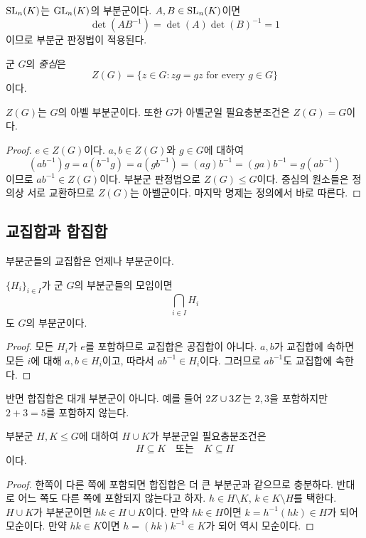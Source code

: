 \begin{example}
$\operatorname{SL}_n(K)$는 $\operatorname{GL}_n(K)$의 부분군이다. $A,B\in\operatorname{SL}_n(K)$이면
\[
  \det(AB^{-1})=\det(A)\det(B)^{-1}=1
\]
이므로 부분군 판정법이 적용된다.
\end{example}

\begin{definition}[중심]
군 $G$의 \emph{중심}은
\[
  Z(G)=\{z\in G:zg=gz\text{ for every }g\in G\}
\]
이다.
\end{definition}

\begin{proposition}
$Z(G)$는 $G$의 아벨 부분군이다. 또한 $G$가 아벨군일 필요충분조건은 $Z(G)=G$이다.
\end{proposition}

\begin{proof}
$e\in Z(G)$이다. $a,b\in Z(G)$와 $g\in G$에 대하여
\[
  (ab^{-1})g=a(b^{-1}g)=a(gb^{-1})=(ag)b^{-1}=(ga)b^{-1}=g(ab^{-1})
\]
이므로 $ab^{-1}\in Z(G)$이다. 부분군 판정법으로 $Z(G)\le G$이다. 중심의 원소들은 정의상 서로 교환하므로 $Z(G)$는 아벨군이다. 마지막 명제는 정의에서 바로 따른다.
\end{proof}

\subsection{교집합과 합집합}

부분군들의 교집합은 언제나 부분군이다.

\begin{proposition}
$\{H_i\}_{i\in I}$가 군 $G$의 부분군들의 모임이면
\[
  \bigcap_{i\in I}H_i
\]
도 $G$의 부분군이다.
\end{proposition}

\begin{proof}
모든 $H_i$가 $e$를 포함하므로 교집합은 공집합이 아니다. $a,b$가 교집합에 속하면 모든 $i$에 대해 $a,b\in H_i$이고, 따라서 $ab^{-1}\in H_i$이다. 그러므로 $ab^{-1}$도 교집합에 속한다.
\end{proof}

반면 합집합은 대개 부분군이 아니다. 예를 들어 $2Z\cup3Z$는 $2,3$을 포함하지만 $2+3=5$를 포함하지 않는다.

\begin{proposition}
부분군 $H,K\le G$에 대하여 $H\cup K$가 부분군일 필요충분조건은
\[
  H\subseteq K\quad\text{또는}\quad K\subseteq H
\]
이다.
\end{proposition}

\begin{proof}
한쪽이 다른 쪽에 포함되면 합집합은 더 큰 부분군과 같으므로 충분하다. 반대로 어느 쪽도 다른 쪽에 포함되지 않는다고 하자. $h\in H\setminus K$, $k\in K\setminus H$를 택한다. $H\cup K$가 부분군이면 $hk\in H\cup K$이다. 만약 $hk\in H$이면 $k=h^{-1}(hk)\in H$가 되어 모순이다. 만약 $hk\in K$이면 $h=(hk)k^{-1}\in K$가 되어 역시 모순이다.
\end{proof}

